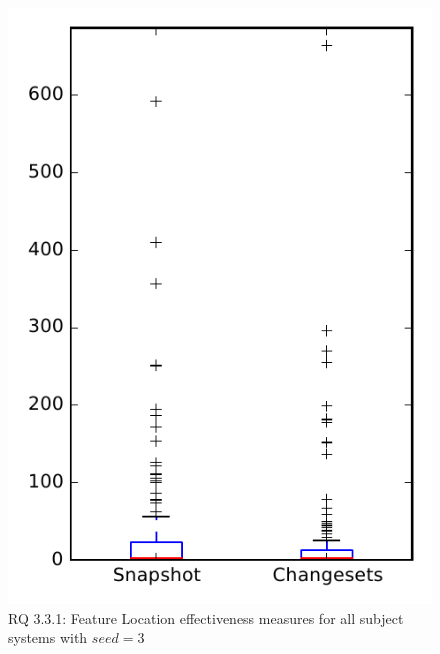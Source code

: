 
\begin{figure}
\centering
\includegraphics[height=0.4\textheight]{figures/flt_seed/rq1_overview_3}
\caption{RQ 3.3.1: Feature Location effectiveness measures for all subject systems with $seed=3$}
\label{fig:flt_seed:rq1:overview}
\end{figure}
